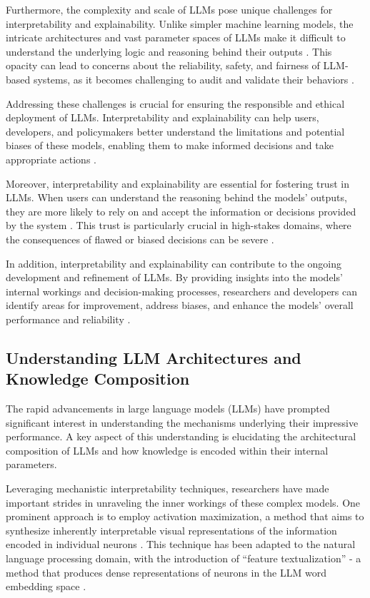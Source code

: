 \documentclass[11pt]{article}
\begin{document}
Furthermore, the complexity and scale of LLMs pose unique challenges for interpretability and explainability. Unlike simpler machine learning models, the intricate architectures and vast parameter spaces of LLMs make it difficult to understand the underlying logic and reasoning behind their outputs \cite{ref237,ref236}. This opacity can lead to concerns about the reliability, safety, and fairness of LLM-based systems, as it becomes challenging to audit and validate their behaviors \cite{ref56}.

Addressing these challenges is crucial for ensuring the responsible and ethical deployment of LLMs. Interpretability and explainability can help users, developers, and policymakers better understand the limitations and potential biases of these models, enabling them to make informed decisions and take appropriate actions \cite{ref55,ref188}.

Moreover, interpretability and explainability are essential for fostering trust in LLMs. When users can understand the reasoning behind the models' outputs, they are more likely to rely on and accept the information or decisions provided by the system \cite{ref236,ref241}. This trust is particularly crucial in high-stakes domains, where the consequences of flawed or biased decisions can be severe \cite{ref240,ref28}.

In addition, interpretability and explainability can contribute to the ongoing development and refinement of LLMs. By providing insights into the models' internal workings and decision-making processes, researchers and developers can identify areas for improvement, address biases, and enhance the models' overall performance and reliability \cite{ref237,ref242}.

\subsection{Understanding LLM Architectures and Knowledge Composition}

The rapid advancements in large language models (LLMs) have prompted significant interest in understanding the mechanisms underlying their impressive performance. A key aspect of this understanding is elucidating the architectural composition of LLMs and how knowledge is encoded within their internal parameters.

Leveraging mechanistic interpretability techniques, researchers have made important strides in unraveling the inner workings of these complex models. One prominent approach is to employ activation maximization, a method that aims to synthesize inherently interpretable visual representations of the information encoded in individual neurons \cite{ref243}. This technique has been adapted to the natural language processing domain, with the introduction of ``feature textualization'' - a method that produces dense representations of neurons in the LLM word embedding space \cite{ref243}.
\end{document}
